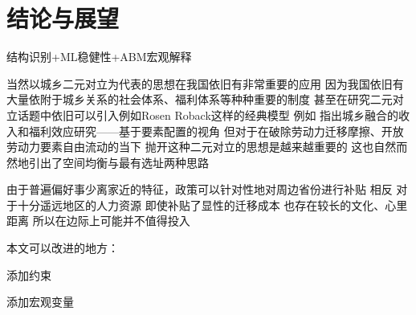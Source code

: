 \documentclass[master, final]{zufe-thesis}
\begin{document}






\chapter{结论与展望}

结构识别+ML稳健性+ABM宏观解释


当然以城乡二元对立为代表的思想在我国依旧有非常重要的应用 因为我国依旧有大量依附于城乡关系的社会体系、福利体系等种种重要的制度
甚至在研究二元对立话题中依旧可以引入例如Rosen Roback这样的经典模型
例如 
\textcite{GuoDongMeiChengXiangRongHeDeShouRuHeFuLiXiaoYingYanJiuJiYuYaoSuPeiZhiDeShiJiao2023}指出城乡融合的收入和福利效应研究——基于要素配置的视角
但对于在破除劳动力迁移摩擦、开放劳动力要素自由流动的当下
抛开这种二元对立的思想是越来越重要的
这也自然而然地引出了空间均衡与最有选址两种思路



由于普遍偏好事少离家近的特征，政策可以针对性地对周边省份进行补贴
相反 对于十分遥远地区的人力资源 即使补贴了显性的迁移成本 也存在较长的文化、心里距离 所以在边际上可能并不值得投入



本文可以改进的地方：

添加约束

添加宏观变量
\end{document}
